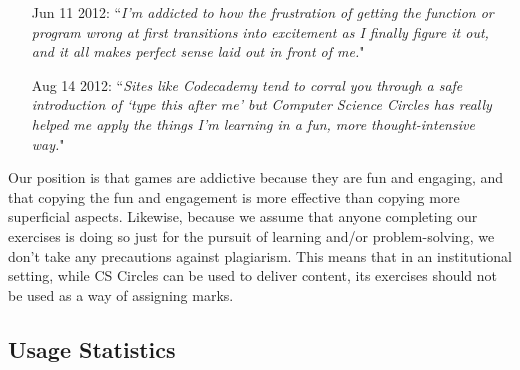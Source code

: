 \documentclass{article}
\begin{document}
{\begin{itemize}
\item[Jun] 11 2012: ``\emph{I'm addicted to how the frustration of getting the function or program wrong at first transitions into excitement as I finally figure it out, and it all makes perfect sense laid out in front of me.}"
\item[Aug] 14 2012: ``\emph{Sites like Codecademy tend to corral you through a safe introduction of `type this after me' but Computer Science Circles has really helped me apply the things I'm learning in a fun, more thought-intensive way.}"
\end{itemize}
Our position is that games are addictive because they are fun and engaging, and that copying the fun and engagement is more effective than copying more superficial aspects. Likewise, because we assume that anyone completing our exercises is doing so just for the pursuit of learning and/or problem-solving, we don't take any precautions against plagiarism. This means that in an institutional setting, while CS Circles can be used to deliver content, its exercises should not be used as a way of assigning marks.

\subsection{Usage Statistics}
\begin{figure}
\centering
{}

\vspace{2.5mm}



\end{figure}}
\end{document}
